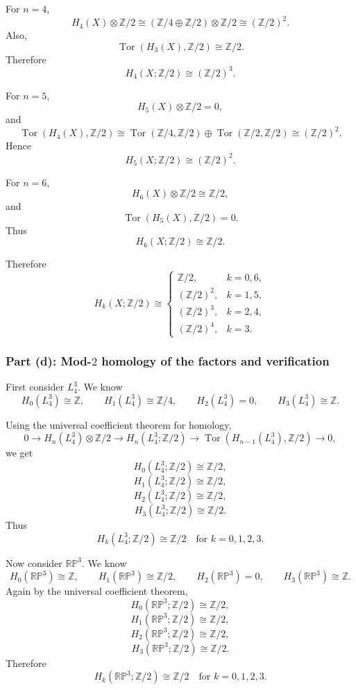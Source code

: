 \documentclass[12pt,a4paper]{article}
\theoremstyle{notespace}
\begin{document}
For \(n=4\),
\[
H_4(X)\otimes \mathbb Z/2
\cong
(\mathbb Z/4\oplus \mathbb Z/2)\otimes \mathbb Z/2
\cong
(\mathbb Z/2)^2.
\]
Also,
\[
\operatorname{Tor}(H_3(X),\mathbb Z/2)
\cong
\mathbb Z/2.
\]
Therefore
\[
H_4(X;\mathbb Z/2)\cong (\mathbb Z/2)^3.
\]

For \(n=5\),
\[
H_5(X)\otimes \mathbb Z/2=0,
\]
and
\[
\operatorname{Tor}(H_4(X),\mathbb Z/2)
\cong
\operatorname{Tor}(\mathbb Z/4,\mathbb Z/2)
\oplus
\operatorname{Tor}(\mathbb Z/2,\mathbb Z/2)
\cong
(\mathbb Z/2)^2.
\]
Hence
\[
H_5(X;\mathbb Z/2)\cong (\mathbb Z/2)^2.
\]

For \(n=6\),
\[
H_6(X)\otimes \mathbb Z/2
\cong
\mathbb Z/2,
\]
and
\[
\operatorname{Tor}(H_5(X),\mathbb Z/2)=0.
\]
Thus
\[
H_6(X;\mathbb Z/2)\cong \mathbb Z/2.
\]

Therefore
\[
\boxed{
	H_k(X;\mathbb Z/2)\cong
	\begin{cases}
		\mathbb Z/2, & k=0,6,\\[1mm]
		(\mathbb Z/2)^2, & k=1,5,\\[1mm]
		(\mathbb Z/2)^3, & k=2,4,\\[1mm]
		(\mathbb Z/2)^4, & k=3.
\end{cases}}
\]

\subsubsection{Part (d): Mod-\(2\) homology of the factors and verification}

First consider \(L_4^3\). We know
\[
H_0(L_4^3)\cong \mathbb Z,
\qquad
H_1(L_4^3)\cong \mathbb Z/4,
\qquad
H_2(L_4^3)=0,
\qquad
H_3(L_4^3)\cong \mathbb Z.
\]

Using the universal coefficient theorem for homology,
\[
0
\longrightarrow
H_n(L_4^3)\otimes \mathbb Z/2
\longrightarrow
H_n(L_4^3;\mathbb Z/2)
\longrightarrow
\operatorname{Tor}(H_{n-1}(L_4^3),\mathbb Z/2)
\longrightarrow
0,
\]
we get
\[
H_0(L_4^3;\mathbb Z/2)\cong \mathbb Z/2,
\]
\[
H_1(L_4^3;\mathbb Z/2)\cong \mathbb Z/2,
\]
\[
H_2(L_4^3;\mathbb Z/2)\cong \mathbb Z/2,
\]
\[
H_3(L_4^3;\mathbb Z/2)\cong \mathbb Z/2.
\]
Thus
\[
\boxed{
	H_k(L_4^3;\mathbb Z/2)\cong \mathbb Z/2
	\quad\text{for }k=0,1,2,3.}
\]

Now consider \(\mathbb{RP}^3\). We know
\[
H_0(\mathbb{RP}^3)\cong \mathbb Z,
\qquad
H_1(\mathbb{RP}^3)\cong \mathbb Z/2,
\qquad
H_2(\mathbb{RP}^3)=0,
\qquad
H_3(\mathbb{RP}^3)\cong \mathbb Z.
\]
Again by the universal coefficient theorem,
\[
H_0(\mathbb{RP}^3;\mathbb Z/2)\cong \mathbb Z/2,
\]
\[
H_1(\mathbb{RP}^3;\mathbb Z/2)\cong \mathbb Z/2,
\]
\[
H_2(\mathbb{RP}^3;\mathbb Z/2)\cong \mathbb Z/2,
\]
\[
H_3(\mathbb{RP}^3;\mathbb Z/2)\cong \mathbb Z/2.
\]
Therefore
\[
\boxed{
	H_k(\mathbb{RP}^3;\mathbb Z/2)\cong \mathbb Z/2
	\quad\text{for }k=0,1,2,3.}
\]
\end{document}
